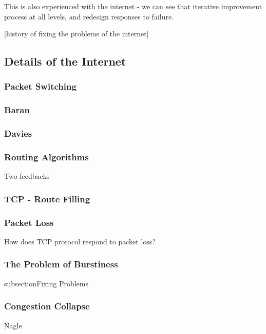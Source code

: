 This is also experienced with the internet - we can see that iterative improvement process at all
levels, and redesign responses to failure.

[history of fixing the problems of the internet]

\subsection{Details of the Internet}


\subsubsection{Packet Switching}

\subsubsection{Baran}
\subsubsection{Davies}

\subsubsection{Routing Algorithms}

Two feedbacks - 

\subsubsection{TCP - Route Filling}

\subsubsection{Packet Loss}

How does TCP protocol respond to packet loss?

\subsubsection{The Problem of Burstiness} 

subsection{Fixing Problems}

\subsubsection{Congestion Collapse}



Nagle \cite{nagle1984}

